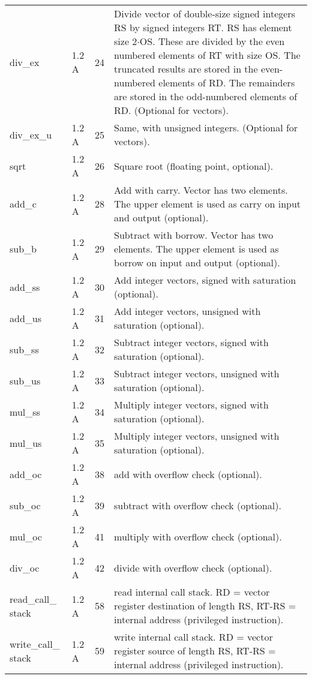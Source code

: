 \documentclass[forwardcom.tex]{subfiles}
\begin{document}
\begin{longtable} {|p{25mm}|p{14mm}|p{10mm}|p{95mm}|}
div\_ex    & 1.2 A & 24 & Divide vector of double-size signed integers RS by signed integers RT. RS has element size 2$\cdot$OS. These are divided by the even numbered
elements of RT with size OS. The truncated results are stored in
the even-numbered elements of RD. The remainders are stored in
the odd-numbered elements of RD. (Optional for vectors). \\
div\_ex\_u    & 1.2 A & 25 & Same, with unsigned integers. (Optional for vectors). \\
sqrt          & 1.2 A & 26 & Square root (floating point, optional). \\
add\_c        & 1.2 A & 28 & Add with carry. Vector has two elements. The upper element is used as carry on input and output (optional). \\
sub\_b        & 1.2 A & 29 & Subtract with borrow. Vector has two elements. The upper element is used as borrow on input and output (optional). \\
add\_ss       & 1.2 A & 30 & Add integer vectors, signed with saturation (optional). \\
add\_us       & 1.2 A & 31 & Add integer vectors, unsigned with saturation (optional). \\
sub\_ss       & 1.2 A & 32 & Subtract integer vectors, signed with saturation (optional). \\
sub\_us       & 1.2 A & 33 & Subtract integer vectors, unsigned with saturation (optional). \\
mul\_ss       & 1.2 A & 34 & Multiply integer vectors, signed with saturation (optional). \\
mul\_us       & 1.2 A & 35 & Multiply integer vectors, unsigned with saturation (optional). \\
add\_oc       & 1.2 A & 38 & add with overflow check (optional). \\
sub\_oc       & 1.2 A & 39 & subtract with overflow check (optional). \\
mul\_oc       & 1.2 A & 41 & multiply with overflow check (optional). \\
div\_oc       & 1.2 A & 42 & divide with overflow check (optional). \\

read\_call\_ stack & 1.2 A & 58 & read internal call stack. RD = vector register destination of length RS, RT-RS = internal address (privileged instruction). \\
write\_call\_ stack & 1.2 A & 59 & write internal call stack. RD = vector register source of length RS, RT-RS = internal address (privileged instruction). \\


\end{longtable}
\end{document}
